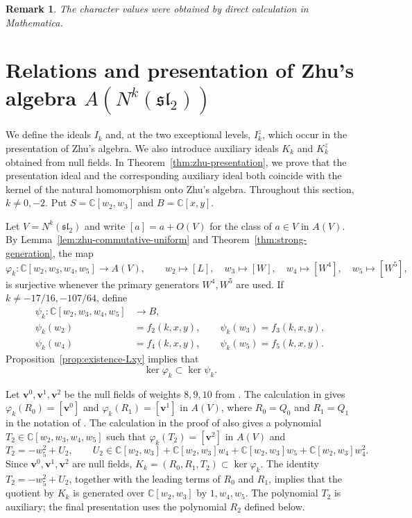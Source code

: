 \documentclass[11 pt]{amsart}
\newtheorem{remark}{Remark}
\theoremstyle{definition}
\theoremstyle{plain}
\begin{document}
\begin{remark}
The character values were obtained by direct calculation in Mathematica.
\end{remark}


\section{Relations and presentation of Zhu's algebra
$A(N^k(\mathfrak{sl}_2))$}
\label{sec:zhu-polynomial-system}
\label{sec:construction-relations}
We define the ideals $I_k$ and, at the two exceptional levels,
$I_k^z$, which occur in the presentation of Zhu's algebra. We also
introduce auxiliary ideals $K_k$ and $K_k^z$ obtained from null fields.
In Theorem~\ref{thm:zhu-presentation}, we prove that the presentation
ideal and the corresponding auxiliary ideal both coincide with the
kernel of the natural homomorphism onto Zhu's algebra.
Throughout this section, $k\neq0,-2$.
Put $S=\mathbb C[w_2,w_3]$ and $B=\mathbb C[x,y]$.

Let $V=N^k(\mathfrak{sl}_2)$ and write $[a]=a+O(V)$ for the class of
$a\in V$ in $A(V)$.  By Lemma~\ref{lem:zhu-commutative-uniform} and
Theorem~\ref{thm:strong-generation}, the map
\[
\varphi_k:\mathbb C[w_2,w_3,w_4,w_5]\longrightarrow A(V),
\qquad
w_2\mapsto[L],\quad w_3\mapsto[W],\quad
w_4\mapsto[W^4],\quad w_5\mapsto[W^5],
\]
is surjective whenever the primary generators $W^4,W^5$ are used.
If $k\neq-17/16,-107/64$, define
\[
\begin{aligned}
\psi_k:\mathbb C[w_2,w_3,w_4,w_5]&\longrightarrow B,\\
\psi_k(w_2)&=f_2(k,x,y),\qquad
\psi_k(w_3)=f_3(k,x,y),\\
\psi_k(w_4)&=f_4(k,x,y),\qquad
\psi_k(w_5)=f_5(k,x,y).
\end{aligned}
\]
Proposition~\ref{prop:existence-Lxy} implies that
\[
  \ker\varphi_k\subset\ker\psi_k.
\]

Let $\mathbf v^0,\mathbf v^1,\mathbf v^2$ be the null fields of weights
$8,9,10$ from \cite[Section~2 and Appendix~C]{DLY}.  The calculation in
\cite[Section~2]{DLY} gives
$\varphi_k(R_0)=[\mathbf v^0]$ and
$\varphi_k(R_1)=[\mathbf v^1]$ in $A(V)$, where $R_0=Q_0$ and
$R_1=Q_1$ in the notation of
\cite{DLY}.
The calculation in the proof of \cite[Lemma~2.6]{DLY} also gives a
polynomial $T_2\in\mathbb C[w_2,w_3,w_4,w_5]$ such that
$\varphi_k(T_2)=[\mathbf v^2]$ in $A(V)$ and
\[
  T_2=-w_5^2+U_2,
  \qquad
  U_2\in
  \mathbb C[w_2,w_3]+\mathbb C[w_2,w_3]w_4+
  \mathbb C[w_2,w_3]w_5+\mathbb C[w_2,w_3]w_4^2.
\]
Since $\mathbf v^0,\mathbf v^1,\mathbf v^2$ are null fields,
$K_k=(R_0,R_1,T_2)\subset\ker\varphi_k$.
The identity $T_2=-w_5^2+U_2$, together with the leading
terms of $R_0$ and $R_1$, implies that the quotient by $K_k$ is generated over
$\mathbb C[w_2,w_3]$ by $1,w_4,w_5$.
The polynomial $T_2$ is auxiliary; the final presentation uses the
polynomial $R_2$ defined below.
\end{document}
